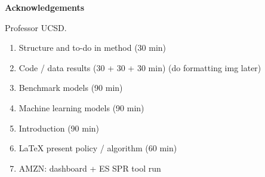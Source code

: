 \documentclass[../../main.tex]{subfiles}
\begin{document}
\thispagestyle{empty}
\newenvironment{acknowledgements}%
    {\cleardoublepage\thispagestyle{empty}\null\vfill\begin{center}%
    \vspace{0pt}
    \bfseries Acknowledgements\end{center}}%
    {\vfill\null}
        \begin{acknowledgements}

Professor UCSD.
\begin{enumerate}
\item Structure and to-do in method (30 min)
\item Code / data results (30 + 30 + 30 min) (do formatting img later)
\item Benchmark models (90 min)
\item Machine learning models (90 min)
\item Introduction (90 min)
\item LaTeX present policy / algorithm (60 min)
\item AMZN: dashboard + ES SPR tool run
\end{enumerate}



        \end{acknowledgements}
\end{document}
